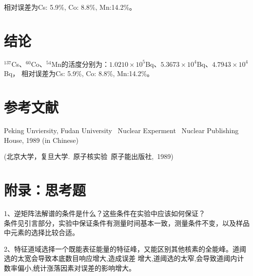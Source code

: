 \documentclass[a4paper,10.0pt,twoside]{npr}
\begin{document}
\begin{multicols}{2}
相对误差为Cs: 5.9\%, Co: 8.8\%, Mn:14.2\%。

\section{结论}

$^{137}$Cs、$^{60}$Co、$^{54}$Mn的活度分别为：$1.0210\times 10^{5}$Bq、$5.3673\times 10^{4}$Bq、$4.7943\times 10^{4}$Bq， 相对误差为Cs: 5.9\%, Co: 8.8\%, Mn:14.2\%。

\section{参考文献}

\noindent
[1] Peking Unviersity, Fudan University \ Nuclear Experment
\ Nuclear Publishing House, 1989 (in Chinese)

\noindent
 (北京大学，复旦大学.\ 原子核实验\ 原子能出版社,\ 1989)

\end{multicols}

\newpage


\section*{附录：思考题}
1、逆矩阵法解谱的条件是什么？这些条件在实验中应该如何保证？\\
条件见引言部分，实验中保证条件有测量时间基本一致，测量条件不变，以及样品中元素的选择比较合适。

2、特征道域选择一个既能表征能量的特征峰，又能区别其他核素的全能峰。道阈选的太宽会导致本底数目响应增大,造成误差
增大,道阈选的太窄,会导致道阈内计数率偏小,统计涨落因素对误差的影响增大。

\clearpage
\end{document}
